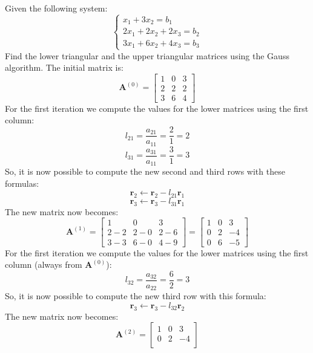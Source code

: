 \documentclass[12pt, a4paper]{report}
\begin{document}
    \begin{example}
        Given the following system: 
        \[  \begin{cases}
                x_1+3x_2=b_1 \\
                2x_1+2x_2+2x_3=b_2 \\
                3x_1+6x_2+4x_3=b_3
            \end{cases}\]
        Find the lower triangular and the upper triangular matrices using the Gauss algorithm. The initial matrix is: 
        \[\boldsymbol{A}^{(0)}=            
            \begin{bmatrix}
                1 & 0 & 3 \\
                2 & 2 & 2 \\
                3 & 6 & 4
            \end{bmatrix}\]
        For the first iteration we compute the values for the lower matrices using the first column: 
        \[l_{21}=\dfrac{a_{21}}{a_{11}}=\dfrac{2}{1}=2\]
        \[l_{31}=\dfrac{a_{31}}{a_{11}}=\dfrac{3}{1}=3\]
        So, it is now possible to compute the new second and third rows with these formulas: 
        \[\boldsymbol{r}_2 \leftarrow \boldsymbol{r}_2 - l_{21}\boldsymbol{r}_1\]
        \[\boldsymbol{r}_3 \leftarrow \boldsymbol{r}_3 - l_{31}\boldsymbol{r}_1\]
        The new matrix now becomes: 
        \[\boldsymbol{A}^{(1)}=            
        \begin{bmatrix}
            1 & 0 & 3 \\
            2-2 & 2-0 & 2-6 \\
            3-3 & 6-0 & 4-9
        \end{bmatrix} =
        \begin{bmatrix}
            1 & 0 & 3 \\
            0 & 2 & -4 \\
            0 & 6 & -5
        \end{bmatrix}\]
        For the first iteration we compute the values for the lower matrices using the first column (always from $\boldsymbol{A}^{(0)}$): 
        \[l_{32}=\dfrac{a_{32}}{a_{22}}=\dfrac{6}{2}=3\]
        So, it is now possible to compute the new third row with this formula: 
        \[\boldsymbol{r}_3 \leftarrow \boldsymbol{r}_3 - l_{32}\boldsymbol{r}_2\]
        The new matrix now becomes: 
        \[\boldsymbol{A}^{(2)}=            
        \begin{bmatrix}
            1 & 0 & 3 \\
            0 & 2 & -4 \\

\end{bmatrix}\]
\end{example}
\end{document}
